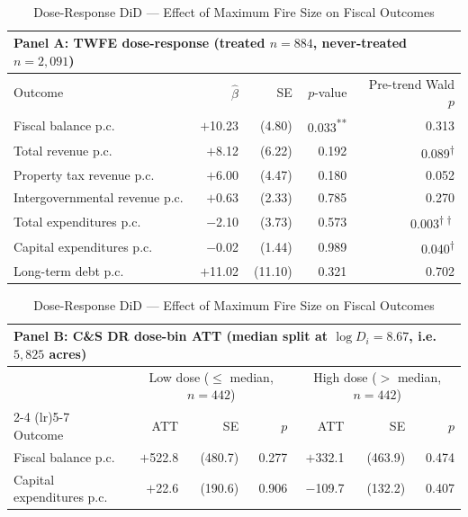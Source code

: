 \documentclass[12pt]{article}
\begin{document}
\begin{table}[h!]
\begin{threeparttable}
\caption{Dose-Response DiD --- Effect of Maximum Fire Size on Fiscal Outcomes}
\label{tab:dose_response}
\centering
\small

\textit{} \\[4pt]
\begin{tabular}{lrrrr}
\multicolumn{5}{l}{Panel A: TWFE dose-response (treated $n=884$, never-treated $n=2{,}091$)} \\
\toprule
Outcome & $\hat{\beta}$ & SE & $p$-value & Pre-trend Wald $p$ \\
\midrule
Fiscal balance p.c.          & $+$10.23 &  (4.80) & 0.033\textsuperscript{**} & 0.313 \\
Total revenue p.c.           &  $+$8.12 &  (6.22) & 0.192 & 0.089\textsuperscript{$\dagger$} \\
Property tax revenue p.c.    &  $+$6.00 &  (4.47) & 0.180 & 0.052 \\
Intergovernmental revenue p.c. & $+$0.63 & (2.33) & 0.785 & 0.270 \\
Total expenditures p.c.      &  $-$2.10 &  (3.73) & 0.573 & 0.003\textsuperscript{$\dagger\dagger$} \\
Capital expenditures p.c.    &  $-$0.02 &  (1.44) & 0.989 & 0.040\textsuperscript{$\dagger$} \\
Long-term debt p.c.          & $+$11.02 & (11.10) & 0.321 & 0.702 \\
\midrule
\end{tabular}

\medskip
\begin{tabular}{lrrrrrr}
\multicolumn{7}{l}{Panel B: C\&S DR dose-bin ATT (median split at $\log D_i = 8.67$, i.e. $5{,}825$ acres)} \\
\toprule
 & \multicolumn{3}{c}{Low dose ($\leq$ median, $n = 442$)} & \multicolumn{3}{c}{High dose ($>$ median, $n = 442$)} \\
\cmidrule(lr){2-4} \cmidrule(lr){5-7}
Outcome & ATT & SE & $p$ & ATT & SE & $p$ \\
\midrule
Fiscal balance p.c.       & $+$522.8 & (480.7) & 0.277 & $+$332.1 & (463.9) & 0.474 \\
Capital expenditures p.c. &  $+$22.6 & (190.6) & 0.906 & $-$109.7 & (132.2) & 0.407 \\
\bottomrule
\end{tabular}


\end{threeparttable}
\end{table}
\end{document}
